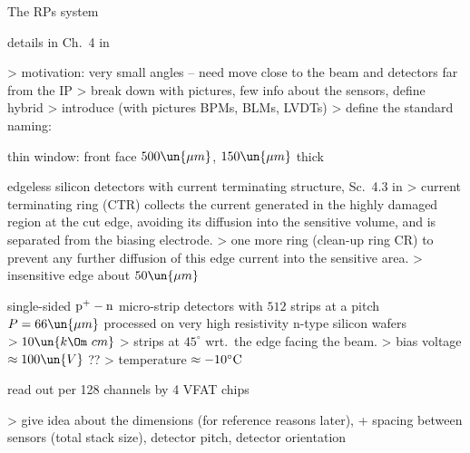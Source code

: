 \caption{The RPs system}

\> details in Ch.~4 in 

\>> motivation: very small angles -- need move close to the beam and detectors far from the IP
\>> break down with pictures, few info about the sensors, define hybrid
\>> introduce (with pictures BPMs, BLMs, LVDTs)
\>> define the standard naming: 


\bmfig
{}
\emfig

\bmfig
{}
\emfig

\bmfig
{}
\emfig

\> thin window: front face $500\un{\mu m}$, $150\un{\mu m}$ thick

\> edgeless silicon detectors with current terminating structure, Sc.~4.3 in 
\>> current terminating ring (CTR) collects the current generated in the highly damaged region at the cut edge, avoiding its diffusion into the sensitive volume, and is separated from the biasing electrode.
\>> one more ring (clean-up ring CR) to prevent any further diffusion of this edge current into the sensitive area.
\>> insensitive edge about $50\un{\mu m}$

\> single-sided $\rm p^+-n$ micro-strip detectors with $512$ strips at a pitch $P = 66\un{\mu m}$ processed on very high resistivity n-type silicon wafers $> 10\un{k\Om\ cm}$
\>> strips at $45^\circ$ wrt.~the edge facing the beam.
\>> bias voltage $\approx 100\un{V}$ ??
\>> temperature $\approx -10^\circ\rm C$

\> read out per 128 channels by 4 VFAT chips


\>> give idea about the dimensions (for reference reasons later), + spacing between sensors (total stack size), detector pitch, detector orientation

